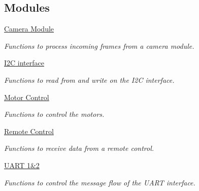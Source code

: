 \subsection*{Modules}
\begin{DoxyCompactItemize}
\item 
\hyperlink{group__camera}{Camera Module}
\begin{DoxyCompactList}\small\item\em Functions to process incoming frames from a camera module. \end{DoxyCompactList}\item 
\hyperlink{group__i2c}{I2\+C interface}
\begin{DoxyCompactList}\small\item\em Functions to read from and write on the I2\+C interface. \end{DoxyCompactList}\item 
\hyperlink{group__motors}{Motor Control}
\begin{DoxyCompactList}\small\item\em Functions to control the motors. \end{DoxyCompactList}\item 
\hyperlink{group__remotecontrol}{Remote Control}
\begin{DoxyCompactList}\small\item\em Functions to receive data from a remote control. \end{DoxyCompactList}\item 
\hyperlink{group__uart}{U\+A\+R\+T 1\&2}
\begin{DoxyCompactList}\small\item\em Functions to control the message flow of the U\+A\+R\+T interface. \end{DoxyCompactList}\end{DoxyCompactItemize}
